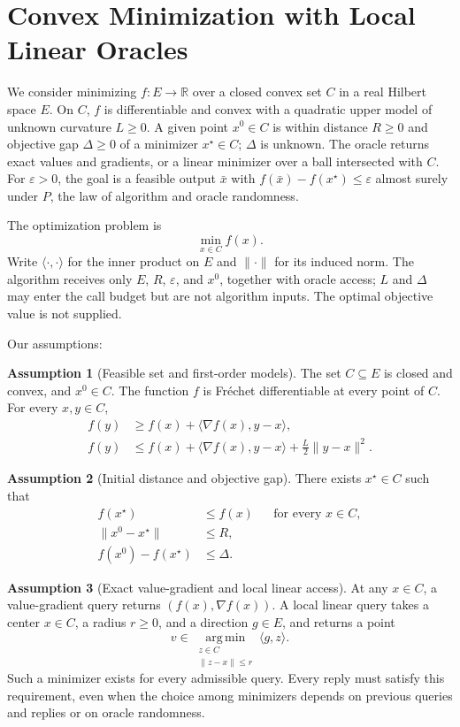 \documentclass[10pt]{article}
\theoremstyle{definition}
\newtheorem{assumption}{Assumption}
\begin{document}
\section*{Convex Minimization with Local Linear Oracles}
We consider minimizing $f:E\to\mathbb{R}$ over a closed convex set $C$ in a real Hilbert space $E$. On $C$, $f$ is differentiable and convex with a quadratic upper model of unknown curvature $L\geq0$. A given point $x^0\in C$ is within distance $R\geq0$ and objective gap $\Delta\geq0$ of a minimizer $x^\star\in C$; $\Delta$ is unknown. The oracle returns exact values and gradients, or a linear minimizer over a ball intersected with $C$. For $\varepsilon>0$, the goal is a feasible output $\bar{x}$ with $f(\bar{x})-f(x^\star)\leq\varepsilon$ almost surely under $P$, the law of algorithm and oracle randomness.

The optimization problem is
\[
\min_{x\in C} f(x).
\]
Write $\langle\cdot,\cdot\rangle$ for the inner product on $E$ and $\|\cdot\|$ for its induced norm. The algorithm receives only $E$, $R$, $\varepsilon$, and $x^0$, together with oracle access; $L$ and $\Delta$ may enter the call budget but are not algorithm inputs. The optimal objective value is not supplied.

Our assumptions:
\begin{assumption}[Feasible set and first-order models]
The set $C\subseteq E$ is closed and convex, and $x^0\in C$. The function $f$ is Fr\'echet differentiable at every point of $C$. For every $x,y\in C$,
\[
\begin{aligned}
f(y)&\geq f(x)+\langle\nabla f(x),y-x\rangle,\\
f(y)&\leq f(x)+\langle\nabla f(x),y-x\rangle
       +\frac{L}{2}\|y-x\|^2.
\end{aligned}
\]
\end{assumption}

\begin{assumption}[Initial distance and objective gap]
There exists $x^\star\in C$ such that
\[
\begin{aligned}
f(x^\star)&\leq f(x) &&\text{for every }x\in C,\\
\|x^0-x^\star\|&\leq R,\\
f(x^0)-f(x^\star)&\leq\Delta.
\end{aligned}
\]
\end{assumption}

\begin{assumption}[Exact value-gradient and local linear access]
At any $x\in C$, a value-gradient query returns $(f(x),\nabla f(x))$. A local linear query takes a center $x\in C$, a radius $r\geq0$, and a direction $g\in E$, and returns a point
\[
v\in\operatorname*{arg\,min}_{\substack{z\in C\\\|z-x\|\leq r}}
\langle g,z\rangle.
\]
Such a minimizer exists for every admissible query. Every reply must satisfy this requirement, even when the choice among minimizers depends on previous queries and replies or on oracle randomness.
\end{assumption}
\end{document}
